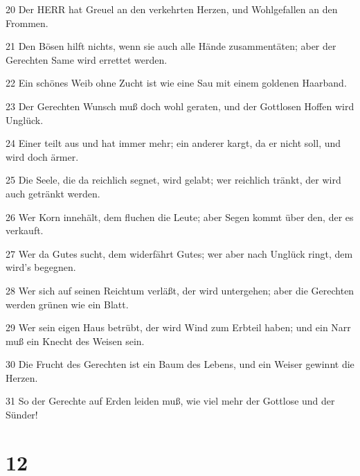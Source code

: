 \par 20 Der HERR hat Greuel an den verkehrten Herzen, und Wohlgefallen an den Frommen.
\par 21 Den Bösen hilft nichts, wenn sie auch alle Hände zusammentäten; aber der Gerechten Same wird errettet werden.
\par 22 Ein schönes Weib ohne Zucht ist wie eine Sau mit einem goldenen Haarband.
\par 23 Der Gerechten Wunsch muß doch wohl geraten, und der Gottlosen Hoffen wird Unglück.
\par 24 Einer teilt aus und hat immer mehr; ein anderer kargt, da er nicht soll, und wird doch ärmer.
\par 25 Die Seele, die da reichlich segnet, wird gelabt; wer reichlich tränkt, der wird auch getränkt werden.
\par 26 Wer Korn innehält, dem fluchen die Leute; aber Segen kommt über den, der es verkauft.
\par 27 Wer da Gutes sucht, dem widerfährt Gutes; wer aber nach Unglück ringt, dem wird's begegnen.
\par 28 Wer sich auf seinen Reichtum verläßt, der wird untergehen; aber die Gerechten werden grünen wie ein Blatt.
\par 29 Wer sein eigen Haus betrübt, der wird Wind zum Erbteil haben; und ein Narr muß ein Knecht des Weisen sein.
\par 30 Die Frucht des Gerechten ist ein Baum des Lebens, und ein Weiser gewinnt die Herzen.
\par 31 So der Gerechte auf Erden leiden muß, wie viel mehr der Gottlose und der Sünder!

\chapter{12}

